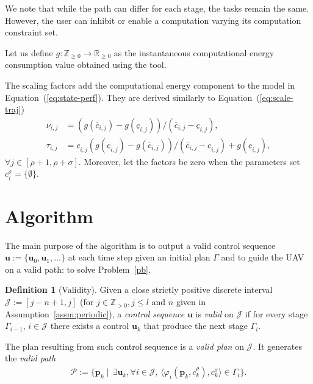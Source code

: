 \documentclass[letterpaper,10pt,conference]{ieeeconf}
\theoremstyle{definition}
\newtheorem{defn}{Definition}[section]
\begin{document}
We note that while the path can differ for each stage, the tasks remain the same. However, the user can inhibit or enable a computation varying its computation constraint set.

Let us define $g:\mathbb{Z}_{\geq 0}\rightarrow\mathbb{R}_{\geq 0}$ as the instantaneous computational energy consumption value obtained using the tool.

The scaling factors add the computational energy component to the model in Equation~(\ref{eq:state-perf}). They are derived similarly to Equation~(\ref{eq:scale-traj})
\begin{equation*}\begin{split}
  \nu_{i,j}&=(g(\overline{c}_{i,j})-g(\underline{c}_{i,j}))/(\overline{c}_{i,j}-\underline{c}_{i,j}),\\
  \tau_{i,j}&=\underline{c}_{i,j}(g(\underline{c}_{i,j})-g(\overline{c}_{i,j}))/(\overline{c}_{i,j}-\underline{c}_{i,j})+g(\underline{c}_{i,j}),
\end{split}\end{equation*}
$\forall j\in[\rho+1,\rho+\sigma]$. Moreover, let the factors be zero when the parameters set $c_i^\sigma=\{\emptyset\}$.



\section{Algorithm}  %
\label{sec:algo}     %
The main purpose of the algorithm is to output a valid control sequence $\mathbf{u}:=\{\mathbf{u}_0,\mathbf{u}_1,\dots\}$ at each time step given an initial plan $\Gamma$ and to guide the UAV on a valid path: to solve Problem~\ref{pb}.

\begin{defn}[Validity]\label{def:valid}
  Given a close strictly positive discrete interval $\mathcal{J}:=[j-n+1,j]$ (for $j\in\mathbb{Z}_{>0},j\leq l$ and $n$ given in Assumption~\ref{assm:periodic}), a \emph{control sequence} $\mathbf{u}$ is \emph{valid} on $\mathcal{J}$ if for every stage $\Gamma_{i-1},\,i\in\mathcal{J}$ there exists a control $\mathbf{u}_k$ that produce the next stage $\Gamma_i$. 
  
  The plan resulting from such control sequence is a \emph{valid plan} on $\mathcal{J}$. It generates the \emph{valid path}
  \begin{equation*}\begin{split}\label{eq:mission-valid}
   \mathcal{P}:=\{\mathbf{p}_{k}\mid\,\exists \mathbf{u}_k,\forall i\in\mathcal{J},\,\langle\varphi_i(\mathbf{p}_{k},c_{k}^\rho),c_{k}^\sigma\rangle\in\Gamma_i\}.
  \end{split}\end{equation*}
\end{defn}
\end{document}
